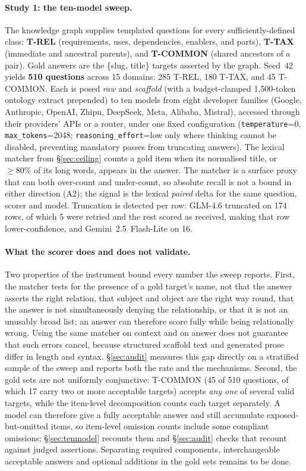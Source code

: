 \documentclass[10pt,twocolumn]{article}
\begin{document}
\paragraph{Study 1: the ten-model sweep.} The knowledge graph supplies templated questions for every sufficiently-defined class: \textbf{T-REL} (requirements, uses, dependencies, enablers, and parts), \textbf{T-TAX} (immediate and ancestral parents), and \textbf{T-COMMON} (shared ancestors of a pair). Gold answers are the \{slug, title\} targets asserted by the graph. Seed~42 yields \textbf{510 questions} across 15 domains: 285 T-REL, 180 T-TAX, and 45 T-COMMON. Each is posed \emph{raw} and \emph{scaffold} (with a budget-clamped 1{,}500-token ontology extract prepended) to ten models from eight developer families (Google, Anthropic, OpenAI, Zhipu, DeepSeek, Meta, Alibaba, Mistral), accessed through their providers' APIs or a router, under one fixed configuration (\texttt{temperature}=0, \texttt{max\_tokens}=2048; \texttt{reasoning\_effort}=low only where thinking cannot be disabled, preventing mandatory passes from truncating answers). The lexical matcher from \S\ref{sec:ceiling} counts a gold item when its normalised title, or $\geq80\%$ of its long words, appears in the answer. The matcher is a surface proxy that can both over-count and under-count, so absolute recall is not a bound in either direction (A2); the signal is the lexical \emph{paired} delta for the same question, scorer and model. Truncation is detected per row: GLM-4.6 truncated on 174 rows, of which 5 were retried and the rest scored as received, making that row lower-confidence, and Gemini~2.5~Flash-Lite on 16.

\paragraph{What the scorer does and does not validate.} Two properties of the instrument bound every number the sweep reports. First, the matcher tests for the presence of a gold target's name, not that the answer asserts the right relation, that subject and object are the right way round, that the answer is not simultaneously denying the relationship, or that it is not an unusably broad list; an answer can therefore score fully while being relationally wrong. Using the same matcher on context and on answer does not guarantee that such errors cancel, because structured scaffold text and generated prose differ in length and syntax. \S\ref{sec:audit} measures this gap directly on a stratified sample of the sweep and reports both the rate and the mechanisms. Second, the gold sets are not uniformly conjunctive: T-COMMON (45 of 510 questions, of which 17 carry two or more acceptable targets) accepts \emph{any one} of several valid targets, while the item-level decomposition counts each target separately. A model can therefore give a fully acceptable answer and still accumulate exposed-but-omitted items, so item-level omission counts include some compliant omissions; \S\ref{sec:tenmodel} recounts them and \S\ref{sec:audit} checks that recount against judged assertions. Separating required components, interchangeable acceptable answers and optional additions in the gold sets remains to be done.
\end{document}
